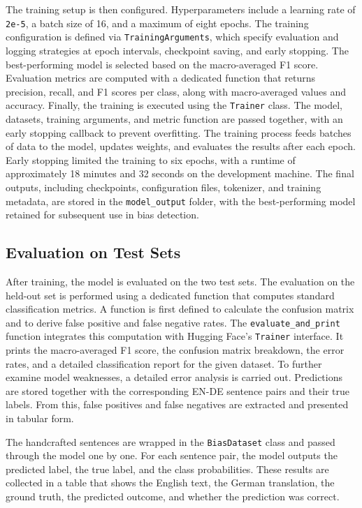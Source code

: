         The training setup is then configured. Hyperparameters include a learning rate of \texttt{2e-5}, a batch size of 16, and a maximum of eight epochs. The training configuration is defined via \texttt{TrainingArguments}, which specify evaluation and logging strategies at epoch intervals, checkpoint saving, and early stopping. The best-performing model is selected based on the macro-averaged F1 score. Evaluation metrics are computed with a dedicated function that returns precision, recall, and F1 scores per class, along with macro-averaged values and accuracy. Finally, the training is executed using the \texttt{Trainer} class. The model, datasets, training arguments, and metric function are passed together, with an early stopping callback to prevent overfitting. The training process feeds batches of data to the model, updates weights, and evaluates the results after each epoch. Early stopping limited the training to six epochs, with a runtime of approximately 18 minutes and 32 seconds on the development machine. The final outputs, including checkpoints, configuration files, tokenizer, and training metadata, are stored in the \texttt{model\_output} folder, with the best-performing model retained for subsequent use in bias detection.

        \subsection{Evaluation on Test Sets}
    After training, the model is evaluated on the two test sets. The evaluation on the held-out set is performed using a dedicated function that computes standard classification metrics. A function is first defined to calculate the confusion matrix and to derive false positive and false negative rates. The \texttt{evaluate\_and\_print} function integrates this computation with Hugging Face's \texttt{Trainer} interface. It prints the macro-averaged F1 score, the confusion matrix breakdown, the error rates, and a detailed classification report for the given dataset. To further examine model weaknesses, a detailed error analysis is carried out. Predictions are stored together with the corresponding EN-DE sentence pairs and their true labels. From this, false positives and false negatives are extracted and presented in tabular form. 

    The handcrafted sentences are wrapped in the \texttt{BiasDataset} class and passed through the model one by one. For each sentence pair, the model outputs the predicted label, the true label, and the class probabilities. These results are collected in a table that shows the English text, the German translation, the ground truth, the predicted outcome, and whether the prediction was correct.  

